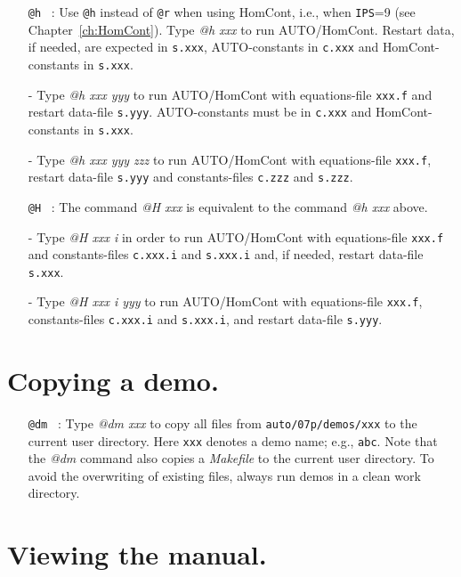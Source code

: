 \documentclass[12pt]{report}
\begin{document}
\begin{itemize}
\item[\tt @h]~:
  Use {\tt @h} instead of {\tt @r} when using {\cal HomCont}, i.e., when {\tt IPS}=9
  (see Chapter~\ref{ch:HomCont}).
  Type {\it @h xxx} to run {\cal AUTO}/{\cal HomCont}.
  Restart data, if needed, are expected in {\tt s.xxx},
  {\cal AUTO}-constants in {\tt c.xxx} and {\cal HomCont}-constants in {\tt s.xxx}.
\item[-]
  Type {\it @h xxx yyy} to run {\cal AUTO}/{\cal HomCont}
  with equations-file {\tt xxx.f} and restart data-file {\tt s.yyy}.
  {\cal AUTO}-constants must be in {\tt c.xxx} and {\cal HomCont}-constants in {\tt s.xxx}.
\item[-]
  Type {\it @h xxx yyy zzz} to run {\cal AUTO}/{\cal HomCont}
  with equations-file {\tt xxx.f}, restart data-file {\tt s.yyy}
  and constants-files {\tt c.zzz} and {\tt s.zzz}.

\item[\tt @H]~:
  The command {\it @H xxx} is equivalent to the command {\it @h xxx} above.
\item[-]
  Type {\it @H xxx i} in order to run {\cal AUTO}/{\cal HomCont} with equations-file {\tt xxx.f}
  and constants-files {\tt c.xxx.i} and {\tt s.xxx.i}
  and, if needed, restart data-file {\tt s.xxx}. 
\item[-]
  Type {\it @H xxx i yyy} to run {\cal AUTO}/{\cal HomCont}
  with equations-file {\tt xxx.f}, 
  constants-files {\tt c.xxx.i} and {\tt s.xxx.i},
  and restart data-file {\tt s.yyy}.
\end{itemize}

\section{ Copying a demo.} 

\begin{itemize}

\item[\tt @dm]~:
  Type {\it @dm xxx} 
  to copy all files 
  from {\tt auto/07p/demos/xxx}
  to the current user directory.
  Here {\tt xxx} denotes a demo name; e.g., {\tt abc}.
  Note that the {\it @dm} command also copies a {\it Makefile}
  to the current user directory. To avoid the overwriting of
  existing files, always run demos in a clean work directory.
\end{itemize}

\section{ Viewing the manual.} 
\end{document}
